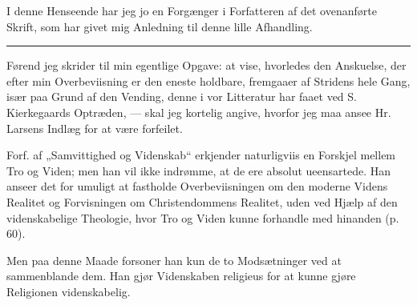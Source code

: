 \documentclass[12pt,a4paper]{book}
\newcommand{\opage}[1]{\marginnote{\footnotesize\textit{[#1]}}}
\begin{document}
I denne Henseende har jeg jo en Forgænger i Forfatteren
af det ovenanførte Skrift, som har givet mig Anledning til
denne lille Afhandling.

\begin{center}\rule{4em}{0.4pt}\end{center}

\opage{6}\setcounter{footnote}{0}%
Førend jeg skrider til min egentlige Opgave: at vise,
hvorledes den Anskuelse, der efter min Overbeviisning er den
eneste holdbare, fremgaaer af Stridens hele Gang, især paa
Grund af den Vending, denne i vor Litteratur har faaet ved
S. Kierkegaards Optræden, --- skal jeg kortelig angive, hvorfor
jeg maa ansee Hr. Larsens Indlæg for at være forfeilet.

Forf. af „Samvittighed og Videnskab“ erkjender naturligviis
en Forskjel mellem Tro og Viden; men han vil ikke
indrømme, at de ere absolut ueensartede. Han anseer det for
umuligt at fastholde Overbeviisningen om den moderne Videns
Realitet og Forvisningen om Christendommens Realitet, uden
ved Hjælp af den videnskabelige Theologie, hvor Tro og Viden
kunne forhandle med hinanden (p. 60).

Men paa denne Maade forsoner han kun de to Modsætninger
ved at sammenblande dem. Han gjør Videnskaben
religieus for at kunne gjøre Religionen videnskabelig.
\end{document}
